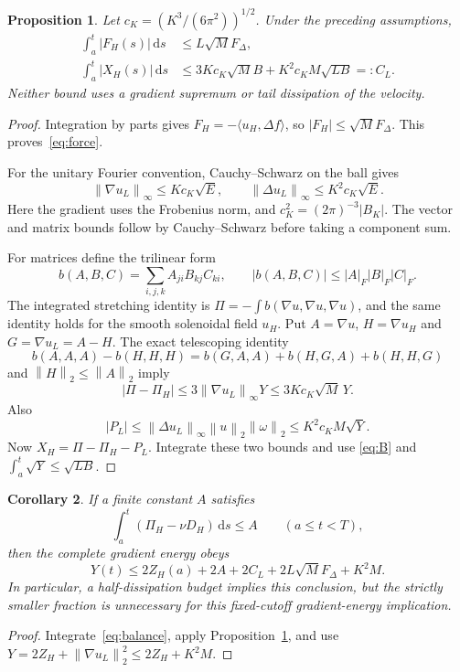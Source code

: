 \documentclass[11pt]{article}
\newtheorem{proposition}{Proposition}
\newtheorem{corollary}[proposition]{Corollary}
\newcommand{\dd}{\,\mathrm d}
\newcommand{\norm}[1]{\left\lVert#1\right\rVert}
\begin{document}
\begin{proposition}\label{prop:allowances}
Let $c_K=(K^3/(6\pi^2))^{1/2}$. Under the preceding assumptions,
\begin{align}
 \int_a^t|F_H(s)|\dd s&\leq L\sqrt M F_\Delta,\label{eq:force}\\
 \int_a^t|X_H(s)|\dd s&\leq
  3Kc_K\sqrt M B+K^2c_KM\sqrt{LB}=:C_L.\label{eq:low}
\end{align}
Neither bound uses a gradient supremum or tail dissipation of the velocity.
\end{proposition}
\begin{proof}
Integration by parts gives $F_H=-\langle u_H,\Delta f\rangle$, so
$|F_H|\leq\sqrt M F_\Delta$. This proves~\eqref{eq:force}.

For the unitary Fourier convention, Cauchy--Schwarz on the ball gives
\[
 \norm{\nabla u_L}_\infty\leq Kc_K\sqrt{E},\qquad
 \norm{\Delta u_L}_\infty\leq K^2c_K\sqrt{E}.
\]
Here the gradient uses the Frobenius norm, and
$c_K^2=(2\pi)^{-3}|B_K|$. The vector and matrix bounds follow by
Cauchy--Schwarz before taking a component sum.

For matrices define the trilinear form
\[
 b(A,B,C)=\sum_{i,j,k} A_{ji}B_{kj}C_{ki},
 \qquad |b(A,B,C)|\leq |A|_F|B|_F|C|_F.
\]
The integrated stretching identity is
$\Pi=-\int b(\nabla u,\nabla u,\nabla u)$, and the same identity holds
for the smooth solenoidal field $u_H$. Put $A=\nabla u$, $H=\nabla u_H$
and $G=\nabla u_L=A-H$. The exact telescoping identity
\[
 b(A,A,A)-b(H,H,H)=b(G,A,A)+b(H,G,A)+b(H,H,G)
\]
and $\norm{H}_2\leq\norm{A}_2$ imply
\begin{equation}\label{eq:cubic}
 |\Pi-\Pi_H|\leq 3\norm{\nabla u_L}_\infty Y
       \leq3Kc_K\sqrt M\,Y.
\end{equation}
Also
\[
 |P_L|\leq\norm{\Delta u_L}_\infty\norm{u}_2\norm{\omega}_2
       \leq K^2c_K M\sqrt Y.
\]
Now $X_H=\Pi-\Pi_H-P_L$. Integrate these two bounds and use
\eqref{eq:B} and $\int_a^t\sqrt Y\leq\sqrt{LB}$.
\end{proof}

\begin{corollary}\label{cor:gradient}
If a finite constant $A$ satisfies
\begin{equation}\label{eq:target}
 \int_a^t(\Pi_H-\nu D_H)\dd s\leq A\qquad(a\leq t<T),
\end{equation}
then the complete gradient energy obeys
\[
 Y(t)\leq 2Z_H(a)+2A+2C_L+2L\sqrt M F_\Delta+K^2M.
\]
In particular, a half-dissipation budget implies this conclusion, but
the strictly smaller fraction is unnecessary for this fixed-cutoff
gradient-energy implication.
\end{corollary}
\begin{proof}
Integrate~\eqref{eq:balance}, apply Proposition~\ref{prop:allowances},
and use $Y=2Z_H+\norm{\nabla u_L}_2^2\leq2Z_H+K^2M$.
\end{proof}
\end{document}
